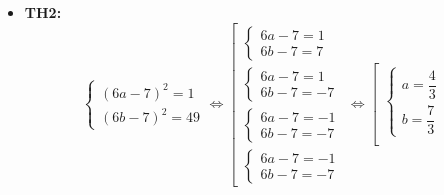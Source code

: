 \begin{ex}
{\begin{enumerate}[a)]
\begin{itemize}
\[\begin{array}{l}
	\begin{cases}
	6a-7=-5\\
	6b-7=-5
	\end{cases}
	\end{array}
	\right.
	\Leftrightarrow
	\left[
	\begin{array}{l}
	\begin{cases}
	a=2\\
	b=2
	\end{cases}\\
	\begin{cases}
	a=2\\
	b=\dfrac{1}{3}
	\end{cases}\\
	\begin{cases}
	a=\dfrac{1}{3}\\
	b=2
	\end{cases}\\
	\begin{cases}
	a=\dfrac{1}{3}\\
	b=\dfrac{1}{3}
	\end{cases}
	\end{array}
	\right.
	\]
	\item \textbf{TH2:}
	\[
	\begin{cases}
	(6a-7)^2=1\\
	(6b-7)^2=49
	\end{cases}
	\Leftrightarrow
	\left[
	\begin{array}{l}
	\begin{cases}
	6a-7=1\\
	6b-7=7
	\end{cases}\\
	\begin{cases}
	6a-7=1\\
	6b-7=-7
	\end{cases}\\
	\begin{cases}
	6a-7=-1\\
	6b-7=-7
	\end{cases}\\
	\begin{cases}
	6a-7=-1\\
	6b-7=-7
	\end{cases}
	\end{array}
	\right.
	\Leftrightarrow
	\left[
	\begin{array}{l}
	\begin{cases}
	a=\dfrac{4}{3}\\
	b=\dfrac{7}{3}
	\end{cases}\\

\end{array}\]
\end{itemize}
\end{enumerate}}
\end{ex}
